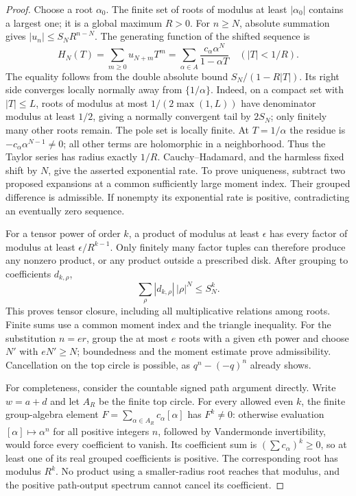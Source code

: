 \begin{proof}
Choose a root $\alpha_0$. The finite set of roots of modulus at least
$|\alpha_0|$ contains a largest one; it is a global maximum $R>0$.
For $n\ge N$, absolute summation gives $|u_n|\le S_NR^{n-N}$.
The generating function of the shifted sequence is
\[
 H_N(T)=\sum_{m\ge0}u_{N+m}T^m
       =\sum_{\alpha\in A}\frac{c_\alpha\alpha^N}{1-\alpha T}
       \quad (|T|<1/R).
\]
The equality follows from the double absolute bound
$S_N/(1-R|T|)$. Its right side converges locally normally away from
$\{1/\alpha\}$. Indeed, on a compact set with $|T|\le L$, roots
of modulus at most $1/(2\max(1,L))$ have denominator modulus at
least $1/2$, giving a normally convergent tail by $2S_N$; only
finitely many other roots remain. The pole set is locally finite.
At $T=1/\alpha$ the residue is
$-c_\alpha\alpha^{N-1}\ne0$; all other terms are holomorphic in a
neighborhood. Thus the Taylor series has radius exactly $1/R$.
Cauchy--Hadamard, and the harmless fixed shift by $N$, give the
asserted exponential rate. To prove uniqueness, subtract two proposed
expansions at a common sufficiently large moment index. Their grouped
difference is admissible. If nonempty its exponential rate is positive,
contradicting an eventually zero sequence.

For a tensor power of order $k$, a product of modulus at least
$\epsilon$ has every factor of modulus at least
$\epsilon/R^{k-1}$. Only finitely many factor tuples can therefore
produce any nonzero product, or any product outside a prescribed disk.
After grouping to coefficients $d_{k,\rho}$,
\[
 \sum_\rho |d_{k,\rho}|\,|\rho|^N\le S_N^k.
\]
This proves tensor closure, including all multiplicative relations
among roots. Finite sums use a common moment index and the triangle
inequality. For the substitution $n=er$, group the at most $e$ roots
with a given $e$th power and choose $N'$ with $eN'\ge N$; boundedness
and the moment estimate prove admissibility. Cancellation on the top
circle is possible, as $q^n-(-q)^n$ already shows.

For completeness, consider the countable signed path argument directly.
Write $w=a+d$ and let $A_R$ be the finite top circle. For every allowed
even $k$, the finite group-algebra element
$F=\sum_{\alpha\in A_R}c_\alpha[\alpha]$ has
$F^k\ne0$: otherwise evaluation $[\alpha]\mapsto\alpha^n$ for
all positive integers $n$, followed by Vandermonde invertibility,
would force every coefficient to vanish. Its coefficient sum is
$(\sum c_\alpha)^k\ge0$, so at least one of its real grouped
coefficients is positive. The corresponding root has modulus $R^k$.
No product using a smaller-radius root reaches that modulus, and the
positive path-output spectrum cannot cancel its coefficient.


\end{proof}
